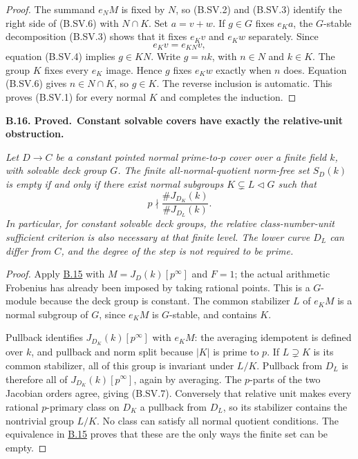 \documentclass[11pt,a4paper]{article}
\newenvironment{claim}[3]{\par\medskip\noindent\hypertarget{#1}{\textbf{#1. #2.}}\ \textbf{#3.}\par\nopagebreak\smallskip\begingroup\itshape}{\endgroup\par\smallskip}
\newcommand{\statementref}[1]{\hyperlink{#1}{#1}}
\begin{document}
\begin{proof}
The summand $e_NM$ is fixed by $N$, so (B.SV.2) and
(B.SV.3) identify the right side of (B.SV.6) with $N\cap K$.
Set $a=v+w$. If $g\in G$ fixes $e_Ka$, the $G$-stable
decomposition (B.SV.3) shows that it fixes $e_Kv$ and
$e_Kw$ separately. Since
\[
                         e_Kv=e_{KN}v,
\]
equation (B.SV.4) implies $g\in KN$. Write $g=nk$, with
$n\in N$ and $k\in K$. The group $K$ fixes every $e_K$
image. Hence $g$ fixes $e_Kw$ exactly when $n$ does.
Equation (B.SV.6) gives $n\in N\cap K$, so $g\in K$.
The reverse inclusion is automatic. This proves (B.SV.1)
for every normal $K$ and completes the induction.
\end{proof}

\begin{claim}{B.16}{Proved}{Constant solvable covers have exactly the relative-unit obstruction}
Let $D\to C$ be a constant pointed normal prime-to-$p$
cover over a finite field $k$, with solvable deck group $G$.
The finite all-normal-quotient norm-free set $S_D(k)$ is empty
if and only if there exist normal subgroups
$K\subsetneq L\triangleleft G$ such that
\[
                         p\nmid
                   \frac{\#J_{D_K}(k)}{\#J_{D_L}(k)}.          \tag{B.SV.7}
\]
In particular, for constant solvable deck groups, the relative
class-number-unit sufficient criterion is also necessary at
that finite level. The lower curve $D_L$ can differ from $C$,
and the degree of the step is not required to be prime.
\end{claim}
\begin{proof}
Apply \statementref{B.15} with
$M=J_D(k)[p^\infty]$ and $F=1$; the actual arithmetic
Frobenius has already been imposed by taking rational points.
This is a $G$-module because the deck group is constant.
The common stabilizer $L$ of $e_KM$ is a normal subgroup of
$G$, since $e_KM$ is $G$-stable, and contains $K$.

Pullback identifies $J_{D_K}(k)[p^\infty]$ with $e_KM$:
the averaging idempotent is defined over $k$, and pullback
and norm split because $|K|$ is prime to $p$.
If $L\supsetneq K$ is its common stabilizer, all of this
group is invariant under $L/K$. Pullback from $D_L$ is
therefore all of $J_{D_K}(k)[p^\infty]$, again by averaging.
The $p$-parts of the two Jacobian orders agree, giving
(B.SV.7). Conversely that relative unit makes every rational
$p$-primary class on $D_K$ a pullback from $D_L$, so its
stabilizer contains the nontrivial group $L/K$. No class can
satisfy all normal quotient conditions. The equivalence in
\statementref{B.15} proves that these are the only ways the
finite set can be empty.
\end{proof}
\end{document}
